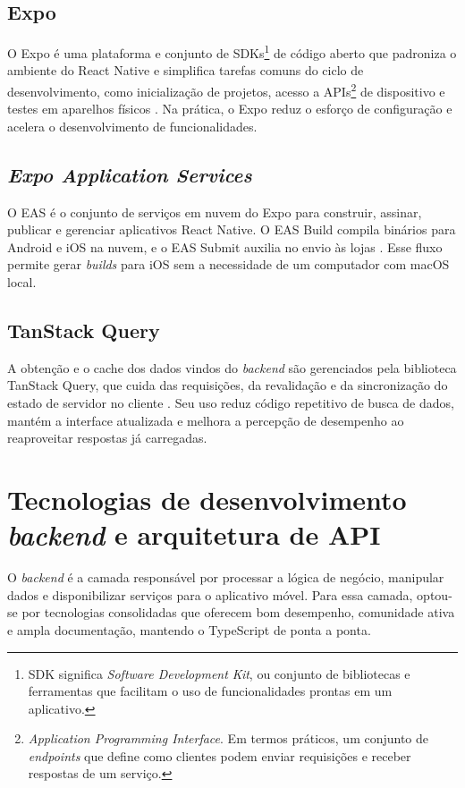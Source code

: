         \subsection{Expo}
        O Expo é uma plataforma e conjunto de SDKs\footnote{SDK significa \textit{Software Development Kit}, ou conjunto de bibliotecas e ferramentas que facilitam o uso de funcionalidades prontas em um aplicativo.} de código aberto que padroniza o ambiente do React Native e simplifica tarefas comuns do ciclo de desenvolvimento, como inicialização de projetos, acesso a APIs\footnote{\textit{Application Programming Interface}. Em termos práticos, um conjunto de \textit{endpoints} que define como clientes podem enviar requisições e receber respostas de um serviço.} de dispositivo e testes em aparelhos físicos \cite{expo_docs}. Na prática, o Expo reduz o esforço de configuração e acelera o desenvolvimento de funcionalidades.

        \subsection{\textit{Expo Application Services}}
        O EAS é o conjunto de serviços em nuvem do Expo para construir, assinar, publicar e gerenciar aplicativos React Native. O EAS Build compila binários para Android e iOS na nuvem, e o EAS Submit auxilia no envio às lojas \cite{eas_build,eas_suite}. Esse fluxo permite gerar \textit{builds} para iOS sem a necessidade de um computador com macOS local.

        \subsection{TanStack Query}
        A obtenção e o cache dos dados vindos do \textit{backend} são gerenciados pela biblioteca TanStack Query, que cuida das requisições, da revalidação e da sincronização do estado de servidor no cliente \cite{tanstack_query_docs}. Seu uso reduz código repetitivo de busca de dados, mantém a interface atualizada e melhora a percepção de desempenho ao reaproveitar respostas já carregadas.

    \section{Tecnologias de desenvolvimento \textit{backend} e arquitetura de API}
        \label{sec:tec-backend}
        O \textit{backend} é a camada responsável por processar a lógica de negócio, manipular dados e disponibilizar serviços para o aplicativo móvel. Para essa camada, optou-se por tecnologias consolidadas que oferecem bom desempenho, comunidade ativa e ampla documentação, mantendo o TypeScript de ponta a ponta.

